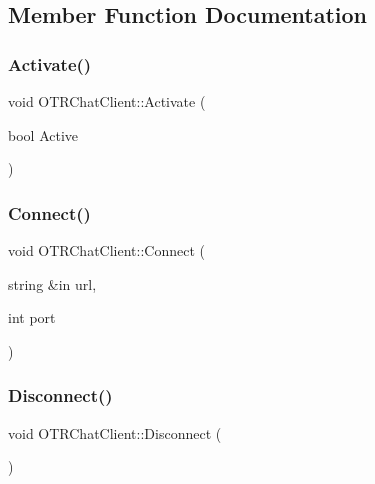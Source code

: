 \subsection{Member Function Documentation}
\hypertarget{class_o_t_r_chat_client_a7f56a3fefb06cb54ff8f25ad9b9ccd91}{}\label{class_o_t_r_chat_client_a7f56a3fefb06cb54ff8f25ad9b9ccd91} 
\subsubsection{\texorpdfstring{Activate()}{Activate()}}
{\footnotesize\ttfamily void O\+T\+R\+Chat\+Client\+::\+Activate (\begin{DoxyParamCaption}\item[{bool}]{Active }\end{DoxyParamCaption})}

\hypertarget{class_o_t_r_chat_client_a8b5dc2d34f7d6e2dd9d821a1852d66ff}{}\label{class_o_t_r_chat_client_a8b5dc2d34f7d6e2dd9d821a1852d66ff} 
\subsubsection{\texorpdfstring{Connect()}{Connect()}}
{\footnotesize\ttfamily void O\+T\+R\+Chat\+Client\+::\+Connect (\begin{DoxyParamCaption}\item[{string \&in}]{url,  }\item[{int}]{port }\end{DoxyParamCaption})}

\hypertarget{class_o_t_r_chat_client_aeeb6c37f983e53a4a007f67f920145e6}{}\label{class_o_t_r_chat_client_aeeb6c37f983e53a4a007f67f920145e6} 
\subsubsection{\texorpdfstring{Disconnect()}{Disconnect()}}
{\footnotesize\ttfamily void O\+T\+R\+Chat\+Client\+::\+Disconnect (\begin{DoxyParamCaption}{ }\end{DoxyParamCaption})}

